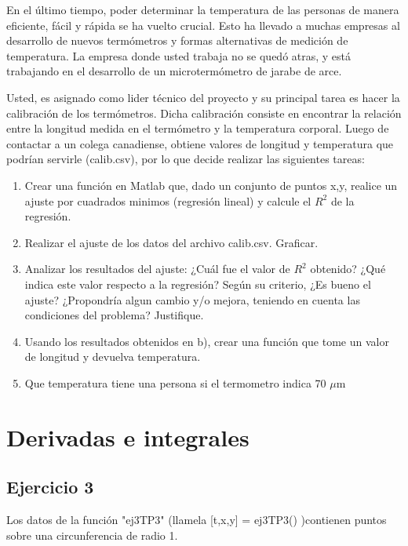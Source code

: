 \documentclass[a4paper,11pt]{article}
\theoremstyle{mytheor}
\begin{document}
En el último tiempo, poder determinar la temperatura de las personas de manera eficiente, fácil y rápida se ha vuelto crucial. Esto ha llevado a muchas empresas al desarrollo de nuevos termómetros y formas alternativas de medición de temperatura. La empresa donde usted trabaja no se quedó atras, y está trabajando en el desarrollo de un microtermómetro de jarabe de arce.

Usted, es asignado como lider técnico del proyecto y su principal tarea es hacer la calibración de los termómetros. Dicha calibración consiste en encontrar la relación entre la longitud medida en el termómetro y la temperatura corporal. Luego de contactar a un colega canadiense, obtiene valores de longitud y temperatura que podrían servirle (calib.csv), por lo que decide realizar las siguientes tareas:

\begin{enumerate}[label=\alph* )]
    \item Crear una función en Matlab que, dado un conjunto de puntos x,y, realice un ajuste por cuadrados minimos (regresión lineal) y calcule el $R^2$ de la regresión.
    \item Realizar el ajuste de los datos del archivo calib.csv. Graficar.
    \item Analizar los resultados del ajuste: ¿Cuál fue el valor de $R^2$ obtenido? ¿Qué indica este valor respecto a la regresión? Según su criterio, ¿Es bueno el ajuste? ¿Propondría algun cambio y/o mejora, teniendo en cuenta las condiciones del problema? Justifique.
    \item Usando los resultados obtenidos en b), crear una función que tome un valor de longitud y devuelva temperatura.
    \item Que temperatura tiene una persona si el termometro indica 70 $\mu$m
    
    \end{enumerate}





\section*{Derivadas e integrales}
%

\subsection*{Ejercicio 3} 

Los datos de la función "ej3TP3" (llamela [t,x,y] = ej3TP3() )contienen puntos sobre una circunferencia de radio 1.
\end{document}
